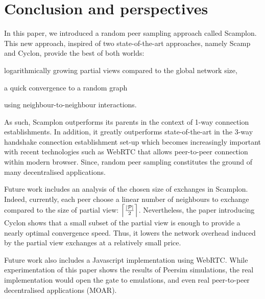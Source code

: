 
\section{Conclusion and perspectives}
\label{sec:conclusion}

In this paper, we introduced a random peer sampling approach called Scamplon.
This new approach, inspired of two state-of-the-art approaches, namely Scamp
and Cyclon, provide the best of both worlds:
\begin{inparaenum}[(i)]
\item logarithmically growing partial views compared to the global network
  size,
\item a quick convergence to a random graph
\item using neighbour-to-neighbour interactions.
\end{inparaenum}
As such, Scamplon outperforms its parents in the context of 1-way connection
establishments. In addition, it greatly outperforms state-of-the-art in the
3-way handshake connection establishment set-up which becomes increasingly
important with recent technologies such as WebRTC that allows peer-to-peer
connection within modern browser. Since, random peer sampling constitutes the
ground of many decentralised applications.

Future work includes an analysis of the chosen size of exchanges in
Scamplon. Indeed, currently, each peer choose a linear number of neighbours to
exchange compared to the size of partial view:
$\left\lceil |\mathcal{P}|\over{2} \right\rceil$. Nevertheless, the paper
introducing Cyclon shows that a small subset of the partial view is enough to
provide a nearly optimal convergence speed. Thus, it lowers the network
overhead induced by the partial view exchanges at a relatively small price.

Future work also includes a Javascript implementation using WebRTC. While
experimentation of this paper shows the results of Peersim simulations, the
real implementation would open the gate to emulations, and even real
peer-to-peer decentralised applications (MOAR).

